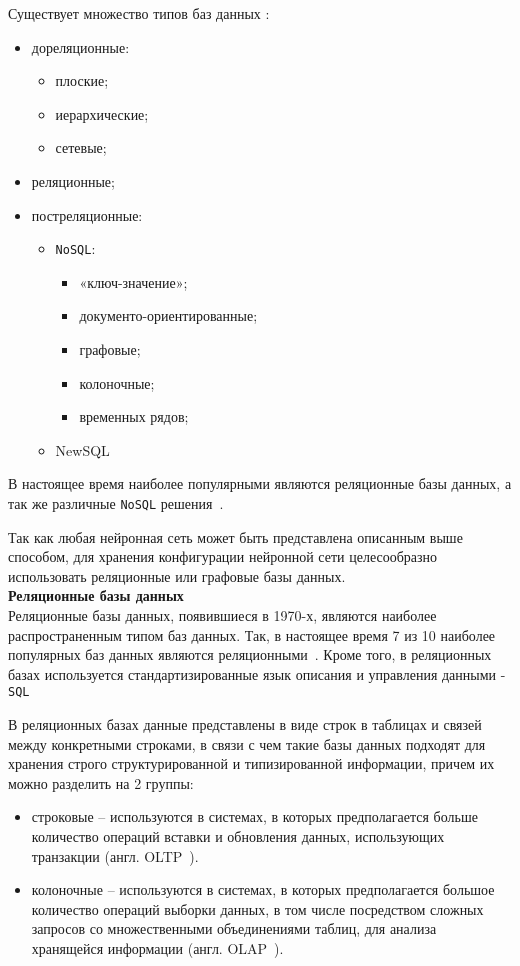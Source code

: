 Существует множество типов баз данных \cite{db-comparison}:
\begin{itemize}
    \item дореляционные:
    \begin{itemize}
        \item плоские;
        \item иерархические;
        \item сетевые;
    \end{itemize}
    \item реляционные;
    \item постреляционные:
    \begin{itemize}
        \item \texttt{NoSQL}:
            \begin{itemize}
                \item «ключ-значение»;
                \item документо-ориентированные;
                \item графовые;
                \item колоночные;
                \item временных рядов;
            \end{itemize}
        \item NewSQL
    \end{itemize}
\end{itemize}

В настоящее время наиболее популярными являются реляционные базы данных, а так же различные \texttt{NoSQL} решения~\cite{modern-db-comparison}.

Так как любая нейронная сеть может быть представлена описанным выше способом, для хранения конфигурации нейронной сети целесообразно использовать реляционные или графовые базы данных.\\

\noindent\textbf{Реляционные базы данных}\\

Реляционные базы данных, появившиеся в 1970-х, являются наиболее распространенным типом баз данных. Так, в настоящее время 7 из 10 наиболее популярных баз данных являются реляционными~\cite{db-ranking}. Кроме того, в реляционных базах используется стандартизированные язык описания и управления данными - \texttt{SQL}

В реляционных базах данные представлены в виде строк в таблицах и связей между конкретными строками, в связи с чем такие базы данных подходят для хранения строго структурированной и типизированной информации, причем их можно разделить на 2 группы:
\begin{itemize}
    \item строковые -- используются в системах, в которых предполагается больше количество операций вставки и обновления данных, использующих транзакции (англ. OLTP~\cite{oltp}).
    \item колоночные -- используются в системах, в которых предполагается большое количество операций выборки данных, в том числе посредством сложных запросов со множественными объединениями таблиц, для анализа хранящейся информации (англ. OLAP~\cite{olap}).
\end{itemize}

